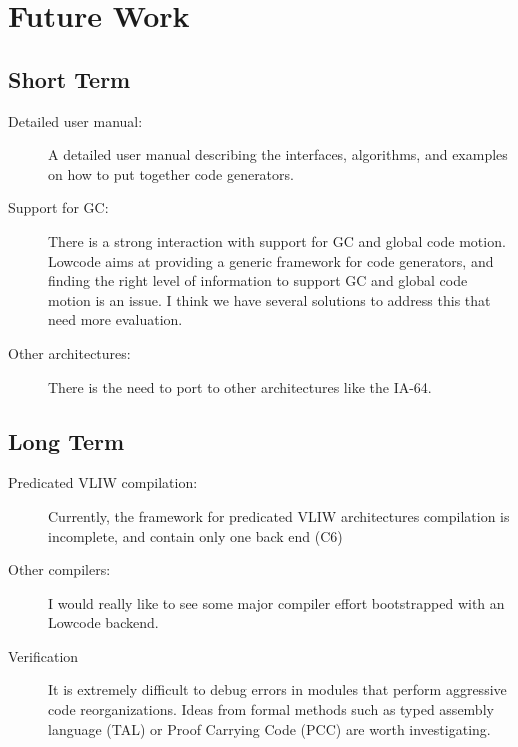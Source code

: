 \section{Future Work}
\subsection{Short Term}

\begin{description}    
\item[Detailed user manual:]
    A detailed user manual describing the interfaces, algorithms, 
    and examples on how to put together code generators.
\item[Support for GC:]
      There is a strong interaction
     with support for GC and global code motion. Lowcode aims at
     providing a generic framework for code generators, and finding
     the right level of information to support GC and global code
     motion is an issue. I think we have several solutions to address
     this that need more evaluation.
\item[Other architectures:] There is the need to port
     to other architectures like the IA-64. 
\end{description}
\hr
\subsection{Long Term}
\begin{description}
 \item[Predicated VLIW compilation:] Currently, the framework
for predicated VLIW architectures compilation
is incomplete, and contain only one back end (C6)
\item[Other compilers:] I would really like to see some
major compiler effort bootstrapped with an Lowcode backend.
\item[Verification] It is extremely difficult to
debug errors in modules that perform aggressive code
reorganizations. Ideas from formal methods such as typed assembly
language (TAL) or Proof Carrying Code (PCC) are worth investigating.
\end{description}
